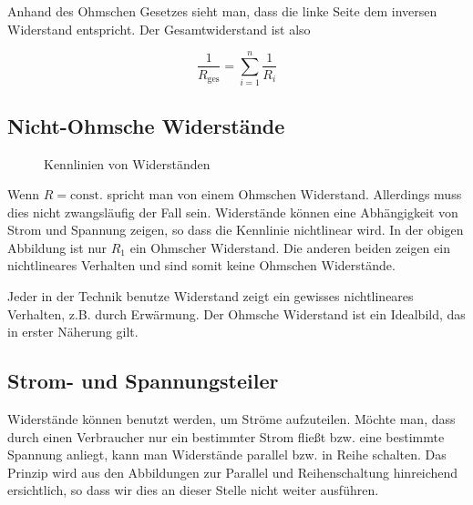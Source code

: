 \documentclass[a4paper,german,12pt,smallheadings]{scrartcl}
\begin{document}
Anhand des Ohmschen Gesetzes sieht man, dass die linke Seite dem inversen
Widerstand entspricht. Der Gesamtwiderstand ist also

\begin{equation}
  \frac{1}{R_\text{ges}} = \sum_{i=1}^n \frac{1}{R_i}
\end{equation}

\subsection{Nicht-Ohmsche Widerstände}
\begin{figure}[H]
  \begin{center}
    \caption{Kennlinien von Widerständen}
  \end{center}
\end{figure}

Wenn $R = \text{const.}$ spricht man von einem Ohmschen Widerstand. Allerdings
muss dies nicht zwangsläufig der Fall sein. Widerstände können eine
Abhängigkeit von Strom und Spannung zeigen, so dass die Kennlinie nichtlinear
wird. In der obigen Abbildung ist nur $R_1$ ein Ohmscher Widerstand. Die
anderen beiden zeigen ein nichtlineares Verhalten und sind somit keine Ohmschen
Widerstände.

Jeder in der Technik benutze Widerstand zeigt ein gewisses nichtlineares
Verhalten, z.B. durch Erwärmung. Der Ohmsche Widerstand ist ein Idealbild, das
in erster Näherung gilt.


\subsection{Strom- und Spannungsteiler}

Widerstände können benutzt werden, um Ströme aufzuteilen. Möchte man, dass
durch einen Verbraucher nur ein bestimmter Strom fließt bzw. eine bestimmte
Spannung anliegt, kann man Widerstände parallel bzw. in Reihe schalten. Das
Prinzip wird aus den Abbildungen zur Parallel und Reihenschaltung hinreichend
ersichtlich, so dass wir dies an dieser Stelle nicht weiter ausführen.
\end{document}
